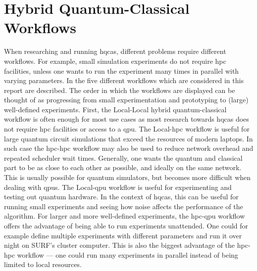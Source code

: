 \section{Hybrid Quantum-Classical Workflows} \label{sec:workflows}
When researching and running \glspl{hqca}, different problems require different workflows.
For example, small simulation experiments do not require \gls{hpc} facilities, unless one wants to run the experiment many times in parallel with varying parameters.
In  the five different workflows which are considered in this report are described.
The order in which the workflows are displayed can be thought of as progressing from small experimentation and prototyping to (large) well-defined experiments.
First, the Local-Local hybrid quantum-classical workflow is often enough for most use cases as most research towards \glspl{hqca} does not require \gls{hpc} facilities or access to a \gls{qpu}.
The Local-\gls{hpc} workflow is useful for large quantum circuit simulations that exceed the resources of modern laptops.
In such case the \gls{hpc}-\gls{hpc} workflow may also be used to reduce network overhead and repeated scheduler wait times.
Generally, one wants the quantum and classical part to be as close to each other as possible, and ideally on the same network.
This is usually possible for quantum simulators, but becomes more difficult when dealing with \glspl{qpu}.
The Local-\gls{qpu} workflow is useful for experimenting and testing out quantum hardware.
In the context of \glspl{hqca}, this can be useful for running small experiments and seeing how noise affects the performance of the algorithm.
For larger and more well-defined experiments, the \gls{hpc}-\gls{qpu} workflow offers the advantage of being able to run experiments unattended.
One could for example define multiple experiments with different parameters and run it over night on SURF's cluster computer.
This is also the biggest advantage of the \gls{hpc}-\gls{hpc} workflow --- one could run many experiments in parallel instead of being limited to local resources.


